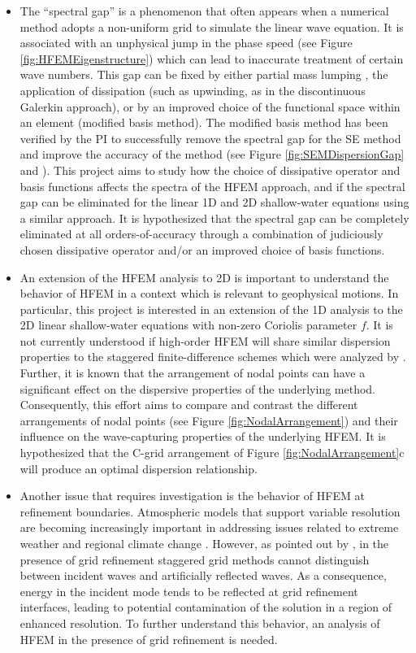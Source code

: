 \documentclass[11pt]{article}
\begin{document}
\begin{itemize}
\item The ``spectral gap'' is a phenomenon that often appears when a numerical method adopts a non-uniform grid to simulate the linear wave equation.  It is associated with an unphysical jump in the phase speed (see Figure \ref{fig:HFEMEigenstructure}) which can lead to inaccurate treatment of certain wave numbers.  This gap can be fixed by either partial mass lumping \citep{ASMTCC2012QJRMS}, the application of dissipation (such as upwinding, as in the discontinuous Galerkin approach), or by an improved choice of the functional space within an element (modified basis method).  The modified basis method has been verified by the PI to successfully remove the spectral gap for the SE method and improve the accuracy of the method (see Figure \ref{fig:SEMDispersionGap} and \cite{PAU2013QJRMS}).  This project aims to study how the choice of dissipative operator and basis functions affects the spectra of the HFEM approach, and if the spectral gap can be eliminated for the linear 1D and 2D shallow-water equations using a similar approach.  It is hypothesized that the spectral gap can be completely eliminated at all orders-of-accuracy through a combination of judiciously chosen dissipative operator and/or an improved choice of basis functions.

\item An extension of the HFEM analysis to 2D is important to understand the behavior of HFEM in a context which is relevant to geophysical motions.  In particular, this project is interested in an extension of the 1D analysis to the 2D linear shallow-water equations with non-zero Coriolis parameter $f$.  It is not currently understood if high-order HFEM will share similar dispersion properties to the staggered finite-difference schemes which were analyzed by \cite{DAR1994MWR}.  Further, it is known that the arrangement of nodal points can have a significant effect on the dispersive properties of the underlying method.  Consequently, this effort aims to compare and contrast the different arrangements of nodal points (see Figure \ref{fig:NodalArrangement}) and their influence on the wave-capturing properties of the underlying HFEM.  It is hypothesized that the C-grid arrangement of Figure \ref{fig:NodalArrangement}c will produce an optimal dispersion relationship.

\item Another issue that requires investigation is the behavior of HFEM at refinement boundaries.  Atmospheric models that support variable resolution are becoming increasingly important in addressing issues related to extreme weather and regional climate change \citep{WCSJBKMGDLDFSHPTDR2012MWR}.  However, as pointed out by \cite{PAUCJ2011JCP}, in the presence of grid refinement staggered grid methods cannot distinguish between incident waves and artificially reflected waves.  As a consequence, energy in the incident mode tends to be reflected at grid refinement interfaces, leading to potential contamination of the solution in a region of enhanced resolution.  To further understand this behavior, an analysis of HFEM in the presence of grid refinement is needed.
\end{itemize}
\end{document}
